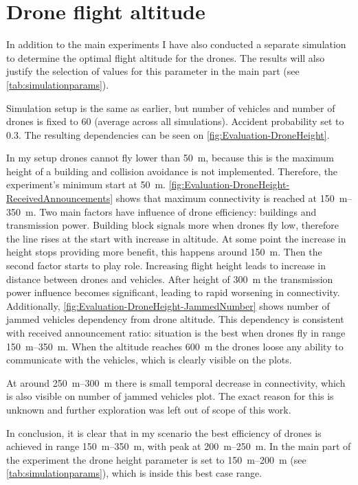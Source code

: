 \documentclass[]{nsm-thesis}
\begin{document}
\section{Drone flight altitude}

In addition to the main experiments I have also conducted a separate simulation to determine the optimal flight altitude for the drones. The results will also justify the selection of values for this parameter in the main part (see \cref{tab:simulationparams}).

Simulation setup is the same as earlier, but number of vehicles and number of drones is fixed to 60 (average across all simulations). Accident probability set to 0.3. The resulting dependencies can be seen on \cref{fig:Evaluation-DroneHeight}.

In my setup drones cannot fly lower than \SI{50}{\meter}, because this is the maximum height of a building and collision avoidance is not implemented. Therefore, the experiment's minimum start at \SI{50}{\meter}. \cref{fig:Evaluation-DroneHeight-ReceivedAnnouncements} shows that maximum connectivity is reached at \SIrange{150}{350}{\meter}. Two main factors have influence of drone efficiency: buildings and transmission power.  Building block signals more when drones fly low, therefore the line rises at the start with increase in altitude. At some point the increase in height stops providing more benefit, this happens around \SI{150}{\meter}. Then the second factor starts to play role. Increasing flight height leads to increase in distance between drones and vehicles. After height of \SI{300}{\meter} the transmission power influence becomes significant, leading to rapid worsening in connectivity. Additionally, \cref{fig:Evaluation-DroneHeight-JammedNumber} shows number of jammed vehicles dependency from drone altitude. This dependency is consistent with received announcement ratio: situation is the best when drones fly in range \SIrange{150}{350}{\meter}. When the altitude reaches \SI{600}{\meter} the drones loose any ability to communicate with the vehicles, which is clearly visible on the plots. 

At around \SIrange{250}{300}{\meter} there is small temporal decrease in connectivity, which is also visible on number of jammed vehicles plot.
The exact reason for this is unknown and further exploration was left out of scope of this work.

In conclusion, it is clear that in my scenario the best efficiency of drones is achieved in range \SIrange{150}{350}{\meter}, with peak at \SIrange{200}{250}{\meter}. In the main part of the experiment the drone height parameter is set to \SIrange{150}{200}{\meter} (see \cref{tab:simulationparams}), which is inside this best case range.
\end{document}
